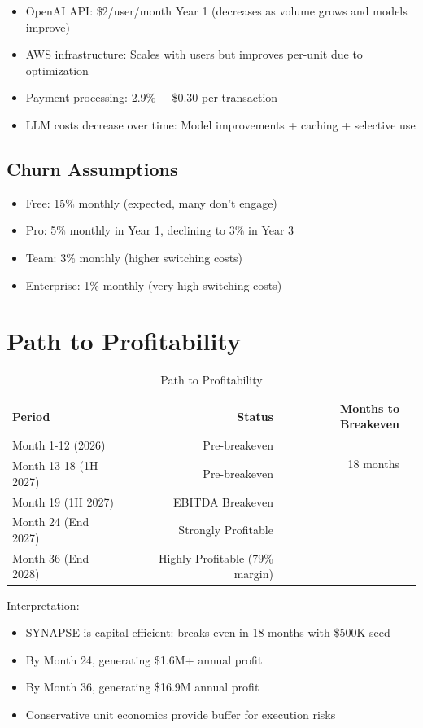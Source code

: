 \documentclass{report}
\begin{document}
\begin{itemize}
    \item OpenAI API: \$2/user/month Year 1 (decreases as volume grows and models improve)
    \item AWS infrastructure: Scales with users but improves per-unit due to optimization
    \item Payment processing: 2.9\% + \$0.30 per transaction
    \item LLM costs decrease over time: Model improvements + caching + selective use
\end{itemize}

\subsection{Churn Assumptions}

\begin{itemize}
    \item Free: 15\% monthly (expected, many don't engage)
    \item Pro: 5\% monthly in Year 1, declining to 3\% in Year 3
    \item Team: 3\% monthly (higher switching costs)
    \item Enterprise: 1\% monthly (very high switching costs)
\end{itemize}

\section{Path to Profitability}

\begin{table}[h]
\centering
\begin{tabular}{|l|r|r|r|}
\toprule
\textbf{Period} & \textbf{Status} & \textbf{Months to Breakeven} \\
\midrule
Month 1-12 (2026) & Pre-breakeven & \multirow{2}{*}{18 months} \\
Month 13-18 (1H 2027) & Pre-breakeven & \\
Month 19 (1H 2027) & EBITDA Breakeven & \\
Month 24 (End 2027) & Strongly Profitable & \\
Month 36 (End 2028) & Highly Profitable (79\% margin) & \\
\bottomrule
\end{tabular}
\caption{Path to Profitability}
\end{table}

Interpretation:
\begin{itemize}
    \item SYNAPSE is capital-efficient: breaks even in 18 months with \$500K seed
    \item By Month 24, generating \$1.6M+ annual profit
    \item By Month 36, generating \$16.9M annual profit
    \item Conservative unit economics provide buffer for execution risks
\end{itemize}
\end{document}
